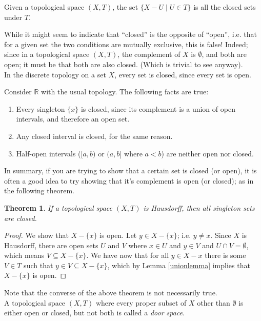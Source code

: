 \documentclass[12pt]{report}
\newcommand{\example}{  \noindent{\sc Example }\hspace{5pt} }
\newcommand{\define}{  \noindent{\sc Definition }\hspace{5pt} }
\newcommand{\corollary} {\noindent{\sc Corollary}\hspace{5pt} }
\newcommand{\reals}{\mathbb{R}}
\newtheorem{theorem}{Theorem}[section]
\begin{document}
\corollary Given a topological space $(X,T)$, the set $\{X-U \mid U \in T\}$
is all the closed sets under $T$.

While it might seem to indicate that ``closed'' is the
opposite of ``open'', i.e. that for a given set the two conditions are mutually
exclusive, this is false! Indeed; since in a topological space $(X,T)$, the
complement of $X$ is $\emptyset$, and both are open; it must be that both are
also closed. (Which is trivial to see anyway).\\

In the discrete topology on a set $X$, every set is closed, since every set is
open. 

\example Consider $\reals$ with the usual topology. The following facts are
true:
\begin{enumerate}
\item Every singleton $\{x\}$ is closed, since its complement is a union of
open intervals, and therefore an open set.
\item Any closed interval is closed, for the same reason.
\item Half-open intervals ($[a,b)$ or $(a,b]$ where $a<b$) are neither open
nor closed.
\end{enumerate}

In summary, if you are trying to show that a certain set is closed (or open),
it is often a good idea to try showing that it's complement is open (or
closed); as in the following theorem.

\begin{theorem}
If a topological space $(X,T)$ is Hausdorff, then all singleton sets are
closed.
\end{theorem}

\begin{proof}
We show that $X - \{x\}$ is open. Let $y \in X - \{x\}$; i.e. $y \neq x$.
Since $X$ is Hausdorff, there are open sets $U$ and $V$ where $x \in U$ and $y
\in V$ and $U \cap V = \emptyset$, which means $V \subseteq X - \{x\}$.
We have now that for all $y \in X - {x}$
there is some $V \in T$ such that $y \in V \subseteq X - \{x\}$, which by
Lemma \ref{unionlemma} implies that $X - \{x\}$ is open.
\end{proof}

Note that the converse of the above theorem is not necessarily true.\\

\define A topological space $(X,T)$ where every proper subset of $X$ other
than $\emptyset$ is either open or closed, but not both is called a
 {\em door space}.\\
\end{document}
